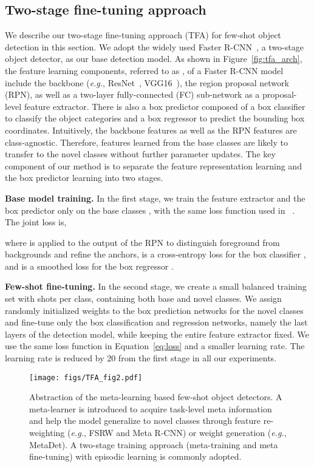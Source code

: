 \documentclass{article}
\newcommand{\model}{TFA\xspace}
\newcommand\minisection[1]{\vspace{1mm}\noindent \textbf{#1}}
\begin{document}
\subsection{Two-stage fine-tuning approach}
\label{sec:tfa}
We describe our two-stage fine-tuning approach (\model) for few-shot object detection in
this section. We adopt the widely used Faster R-CNN~\cite{ren2015faster}, a two-stage object
detector, as our base detection model. As shown in Figure~\ref{fig:tfa_arch}, the feature learning components, referred to as , of a Faster R-CNN model include the backbone (\textit{e.g.}, ResNet~\cite{he2016deep}, VGG16~\cite{simonyan2014very}), the region proposal network (RPN), as well as a two-layer
fully-connected (FC) sub-network as a proposal-level feature extractor. 
There is also a box predictor composed of a box classifier  to classify the
object categories and a box regressor  to predict the bounding box coordinates. 
Intuitively, the backbone features as well as the RPN features
are class-agnostic. Therefore, features learned from the base classes are likely to transfer
to the novel classes without further parameter updates. The key component of our method is to separate the
feature representation learning and the box predictor learning into two stages. 

\minisection{Base model training.} In the first stage, we train the feature extractor 
and the box predictor only on the base classes , with the same loss function used in ~\citet{ren2015faster}. The joint loss is, 

where  is applied
to the output of the RPN to distinguish foreground from backgrounds and refine the
anchors,  is a cross-entropy loss for the box classifier ,
and  is a smoothed  loss for the box regressor .

\minisection{Few-shot fine-tuning.} In the second stage, we create a small balanced training set 
with  shots per class, containing both base and novel classes.
We assign randomly initialized weights to the box prediction networks for the novel classes
and fine-tune only the box classification and
regression networks, namely the last layers of the detection model, while keeping the entire 
feature extractor  fixed. We use the same loss function
in Equation~\ref{eq:loss} and a smaller learning rate. The learning rate is reduced by 20 from the first stage in all our experiments. 

\begin{figure*}[ht]
    \centering
    \texttt{[image: figs/TFA\_fig2.pdf]}
    \vspace{-8mm}
    \caption{Abstraction of the meta-learning based few-shot object detectors. A meta-learner is introduced to acquire task-level meta information and help the model generalize to novel classes through feature re-weighting (\textit{e.g.}, FSRW and Meta R-CNN) or weight generation (\textit{e.g.}, MetaDet). A two-stage training approach (meta-training and meta fine-tuning) with episodic learning is commonly adopted.}
    \label{fig:meta_arch}
\end{figure*}
\end{document}
